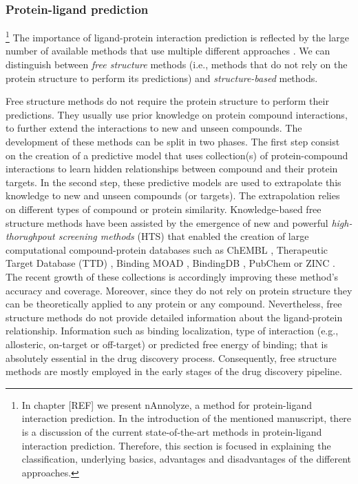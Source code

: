 \documentclass[12pt, b5paper,twoside]{tesi_upf}
\begin{document}
\subsubsection{Protein-ligand prediction}\label{prediction ligand-target}

\par  \footnote{In chapter [REF] we present nAnnolyze, a method for protein-ligand interaction prediction. In the introduction of the mentioned manuscript, there is a discussion of the current state-of-the-art methods in protein-ligand interaction prediction. Therefore, this section is focused in explaining the classification, underlying basics, advantages and disadvantages of the different approaches.} The importance of ligand-protein interaction prediction is reflected by the large number of available methods that use multiple different approaches \cite{Csermely2013, prathipati2015}. We can distinguish between \textit{free structure} methods (i.e., methods that do not rely on the protein structure to perform its predictions) and \textit{structure-based} methods.    
\par Free structure methods do not require the protein structure to perform their predictions. They usually use prior knowledge on protein compound interactions, to further extend the interactions to new and unseen compounds. The development of these methods can be split in two phases. The first step consist on the creation of a predictive model that uses collection(s) of protein-compound interactions to learn hidden relationships between compound and their protein targets.  In the second step, these predictive models are used to extrapolate this knowledge to new and unseen compounds (or targets). The extrapolation relies on different types of compound or protein similarity. Knowledge-based free structure methods have been assisted by the emergence of new and powerful \textit{high-thorughpout screening methods} (HTS) that enabled the creation of large computational compound-protein databases such as ChEMBL \cite{Bento2014}, Therapeutic Target Database (TTD) \cite{Zhu2012a}, Binding MOAD \cite{Hu2005}, BindingDB \cite{Liu2007}, PubChem \cite{Kim2016, Wang2014} or ZINC \cite{Irwin2012}. The recent growth of these collections is accordingly improving these method's accuracy and coverage. Moreover, since they do not rely on protein structure they can be theoretically applied to any protein or any compound. Nevertheless, free structure methods do not provide detailed information about the ligand-protein relationship. Information such as binding localization, type of interaction (e.g., allosteric, on-target or off-target) or predicted free energy of binding;  that is absolutely essential in the drug discovery process. Consequently, free structure methods are mostly employed in the early stages of the drug discovery pipeline. 
\end{document}
